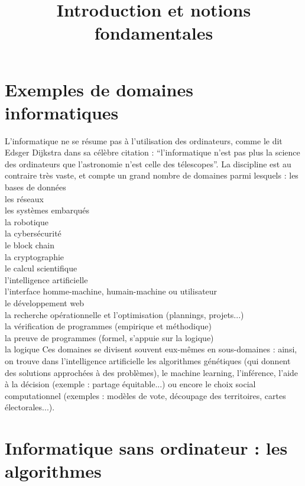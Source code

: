 

\usepackage{euscript}



\title{Introduction et notions fondamentales}

\section{Exemples de domaines informatiques}

	L'informatique ne se résume pas à l'utilisation des ordinateurs, comme le dit Edsger Dijkstra dans sa célèbre citation : ``l'informatique n'est pas plus la science des ordinateurs que l'astronomie n'est celle des télescopes''. La discipline est au contraire très vaste, et compte un grand nombre de domaines parmi lesquels : \nt
			 \bdot les bases de données \\
			 \bdot les réseaux \\
			 \bdot les systèmes embarqués \\
			 \bdot la robotique \\
			 \bdot la cybersécurité \\
			 \bdot le block chain \\
			 \bdot la cryptographie \\
			 \bdot le calcul scientifique \\
			 \bdot l'intelligence artificielle \\
			 \bdot l'interface homme-machine, humain-machine ou utilisateur \\
			 \bdot le développement web \\
			 \bdot la recherche opérationnelle et l'optimisation (plannings, projets...) \\
			 \bdot la vérification de programmes (empirique et méthodique) \\
			 \bdot la preuve de programmes (formel, s'appuie sur la logique) \\
			 \bdot la logique \nt
	Ces domaines se divisent souvent eux-mêmes en sous-domaines : ainsi, on trouve dans l'intelligence artificielle les algorithmes génétiques (qui donnent des solutions approchées à des problèmes), le machine learning, l'inférence, l'aide à la décision (exemple : partage équitable...) ou encore le choix social computationnel (exemples : modèles de vote, découpage des territoires, cartes électorales...).
	
\section{Informatique sans ordinateur : les algorithmes}
	

